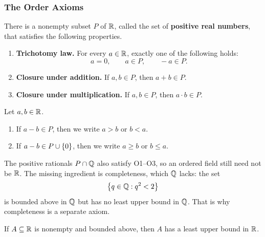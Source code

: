 \subsubsection{The Order Axioms}
\begin{definition}\label{def:order-properties}
    There is a nonempty subset $P$ of $\mathbb{R}$, called the set of \textbf{positive real
    numbers}, that satisfies the following properties.
    \begin{enumerate}[label=\textbf{O\arabic*.}, leftmargin=3em]
        \item \textbf{Trichotomy law.}
        For every $a \in \mathbb{R}$, exactly one of the following holds:
        \begin{equation*}
            a = 0, \qquad a \in P, \qquad -a \in P.
        \end{equation*}

        \item \textbf{Closure under addition.}
        If $a, b \in P$, then $a + b \in P$.

        \item \textbf{Closure under multiplication.}
        If $a, b \in P$, then $a \cdot b \in P$.
    \end{enumerate}
\end{definition}


\begin{definition}\label{def:order-relation}
    Let $a, b \in \mathbb{R}$.
    \begin{enumerate}
        \item If $a - b \in P$, then we write $a > b$ or $b < a$.
        \item If $a - b \in P \cup \left\{0\right\}$, then we write $a \geq b$ or $b \leq a$.
    \end{enumerate}
\end{definition}


The positive rationals $P\cap\mathbb{Q}$ also satisfy O1--O3, so an ordered field still need not be $\mathbb{R}$. The missing ingredient is completeness, which $\mathbb{Q}$ lacks: the set
\[
    \left\{q\in\mathbb{Q}:q^2<2\right\}
\]
is bounded above in $\mathbb{Q}$ but has no least upper bound in $\mathbb{Q}$. That is why completeness is a separate axiom.


\begin{definition}\label{def:completeness-preview}
    If $A \subseteq \mathbb{R}$ is nonempty and bounded above, then $A$ has a least upper
    bound in $\mathbb{R}$.
\end{definition}


